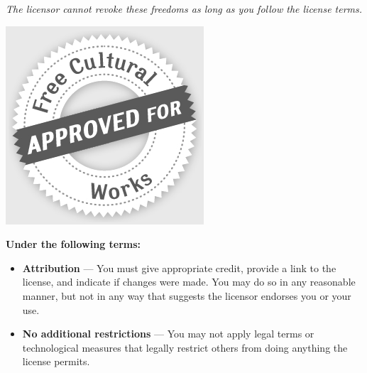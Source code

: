 {\begin{frame}[plain]
\begin{tcolorbox}[colback=my-grey,
		colframe=my-grey,  
		center, arc=0pt,outer arc=0pt,
		valign=top, 
		halign=left,
		width=\textwidth]
\begin{minipage}{0.83\textwidth}
			\textit{The licensor cannot revoke these freedoms as long as you follow the license terms.}
		\end{minipage}
		\begin{minipage}{0.15\textwidth}
			\includegraphics[width=\textwidth]{../../img/licence/FreeCulturalWorks_seal_x2.jpg}
		\end{minipage}
	
		
		\begin{center}
			\bfseries\Large
			Under the following terms:
		\end{center}
		
		\begin{itemize}
			\item[] \textbf{Attribution} — You must give appropriate credit, provide a link to the license, and indicate if changes were made. You may do so in any reasonable manner, but not in any way that suggests the licensor endorses you or your use.
			\item[] \textbf{No additional restrictions} — You may not apply legal terms or technological measures that legally restrict others from doing anything the license permits.
		\end{itemize}
		
	\end{tcolorbox}
	


\end{frame}}
